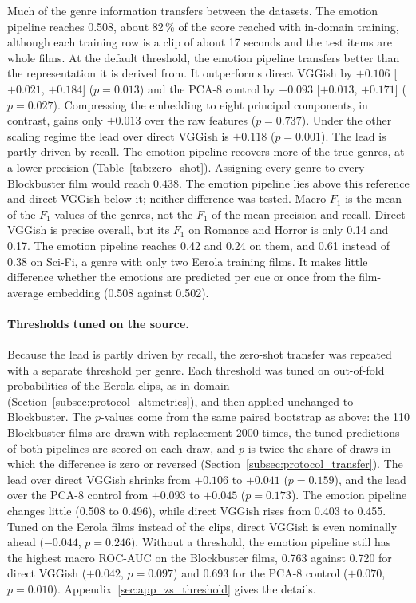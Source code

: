 Much of the genre information transfers between the datasets. The emotion pipeline reaches 0.508,
about 82\,\% of the score reached with in-domain training, although each training row is a clip of about 17 seconds and the test
items are whole films. At the default threshold, the emotion pipeline transfers better
than the representation it is derived from. It outperforms direct VGGish by
$+0.106$ [$+0.021$, $+0.184$] ($p=0.013$) and the PCA-8 control by $+0.093$
[$+0.013$, $+0.171$] ($p=0.027$). Compressing the embedding to eight principal components,
in contrast, gains only $+0.013$ over the raw features ($p=0.737$). Under the other
scaling regime the lead over direct VGGish is $+0.118$ ($p=0.001$). The lead is partly
driven by recall. The emotion pipeline recovers more of the true genres, at a lower
precision (Table~\ref{tab:zero_shot}). Assigning every genre to every Blockbuster film
would reach 0.438. The emotion pipeline lies above this reference and direct VGGish below it; neither difference was tested. Macro-$F_1$ is the mean of the $F_1$
values of the genres, not the $F_1$ of the mean precision and recall. Direct VGGish is
precise overall, but its $F_1$ on Romance and Horror is only 0.14 and 0.17. The emotion
pipeline reaches 0.42 and 0.24 on them, and 0.61 instead of 0.38 on Sci-Fi, a genre with only two Eerola training films. It makes
little difference whether the emotions are predicted per cue or once from the film-average
embedding (0.508 against 0.502).

\paragraph{Thresholds tuned on the source.} Because the lead is partly driven by recall,
the zero-shot transfer was repeated with a separate threshold per genre. Each threshold was
tuned on out-of-fold probabilities of the Eerola clips, as in-domain
(Section~\ref{subsec:protocol_altmetrics}), and then applied unchanged to Blockbuster. The
$p$-values come from the same paired bootstrap as above: the 110 Blockbuster films are drawn
with replacement 2000 times, the tuned predictions of both pipelines are scored on each
draw, and $p$ is twice the share of draws in which the difference is zero or reversed
(Section~\ref{subsec:protocol_transfer}). The lead over direct
VGGish shrinks from $+0.106$ to $+0.041$ ($p=0.159$), and the lead over the PCA-8 control
from $+0.093$ to $+0.045$ ($p=0.173$). The emotion pipeline changes little (0.508 to 0.496),
while direct VGGish rises from 0.403 to 0.455. Tuned on the Eerola films instead of the
clips, direct VGGish is even nominally ahead ($-0.044$, $p=0.246$). Without a threshold,
the emotion pipeline still has the highest macro ROC-AUC on the Blockbuster films, 0.763
against 0.720 for direct VGGish ($+0.042$, $p=0.097$) and 0.693 for the PCA-8 control
($+0.070$, $p=0.010$). Appendix~\ref{sec:app_zs_threshold} gives the details.

